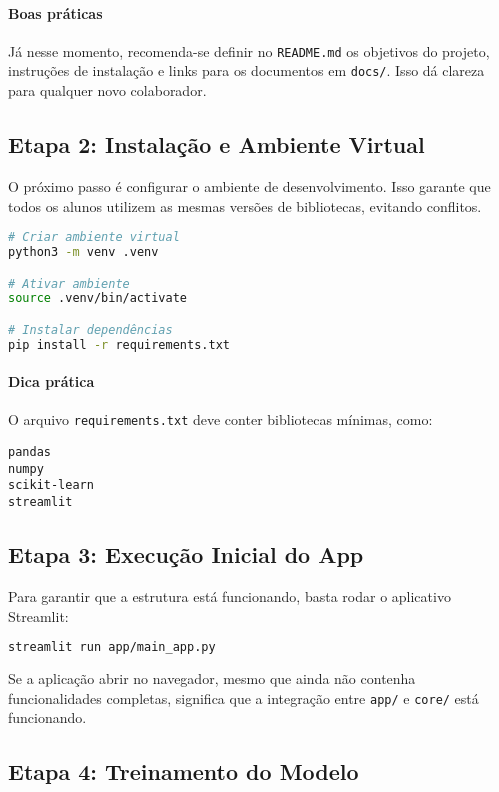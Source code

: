 \documentclass[12pt,a4paper]{article}
\begin{document}
\paragraph{Boas práticas}  
Já nesse momento, recomenda-se definir no \texttt{README.md} os objetivos do projeto, instruções de instalação e links para os documentos em \texttt{docs/}. Isso dá clareza para qualquer novo colaborador.

\subsection{Etapa 2: Instalação e Ambiente Virtual}

O próximo passo é configurar o ambiente de desenvolvimento. Isso garante que todos os alunos utilizem as mesmas versões de bibliotecas, evitando conflitos.

\begin{lstlisting}[language=bash]
# Criar ambiente virtual
python3 -m venv .venv

# Ativar ambiente
source .venv/bin/activate

# Instalar dependências
pip install -r requirements.txt
\end{lstlisting}

\paragraph{Dica prática}  
O arquivo \texttt{requirements.txt} deve conter bibliotecas mínimas, como:

\begin{lstlisting}
pandas
numpy
scikit-learn
streamlit
\end{lstlisting}

\subsection{Etapa 3: Execução Inicial do App}

Para garantir que a estrutura está funcionando, basta rodar o aplicativo Streamlit:

\begin{lstlisting}[language=bash]
streamlit run app/main_app.py
\end{lstlisting}

Se a aplicação abrir no navegador, mesmo que ainda não contenha funcionalidades completas, significa que a integração entre \texttt{app/} e \texttt{core/} está funcionando.

\subsection{Etapa 4: Treinamento do Modelo}
\end{document}

